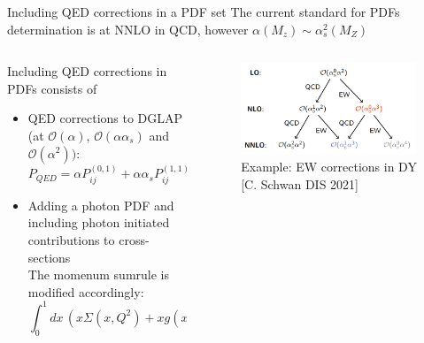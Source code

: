\documentclass[8pt,t]{beamer}
\begin{document}
\begin{frame}{Including QED corrections in a PDF set}
  The current standard for PDFs determination is at NNLO in QCD, however  $\alpha(M_z) \sim \alpha_s^2(M_Z)$

  \begin{columns}
    \begin{column}{0.49\textwidth}

      \vspace*{1em}
      Including QED corrections in PDFs consists of \vspace*{0.5em}
      \begin{itemize}
        \item QED corrections to DGLAP (at $\mathcal{O}(\alpha)$, $\mathcal{O}(\alpha \alpha_s)$ and $\mathcal{O}(\alpha^2))$: \\
        $P_{QED}=\alpha P_{ij}^{(0,1)}+\alpha \alpha_s P_{ij}^{(1,1)}+\alpha^2 P_{ij}^{(0,2)}+\ldots$
        \vspace*{0.5em}
        \item Adding a photon PDF and including photon initiated contributions to cross-sections \\
        The momenum sumrule is modified accordingly:
        \begin{equation*}
          \int_0^1 dx\, \left(  x\Sigma(x,Q^2) + xg(x,Q^2) + x\gamma(x,Q^2) \right) =1
        \end{equation*}
      \end{itemize}
    \end{column}

    \begin{column}{0.49\textwidth}
      \begin{figure}
        \includegraphics[width=0.99\textwidth]{figures/ewcorrections_dy.png}
        \caption*{Example: EW corrections in DY\\ {\color{gray}\small [C. Schwan DIS 2021]}}
      \end{figure}
    \end{column}
  \end{columns}
\end{frame}
\end{document}
